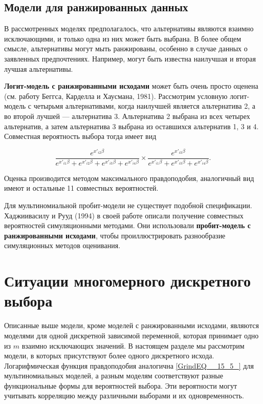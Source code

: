 \subsection{Модели для ранжированных данных}

В рассмотренных моделях предполагалось, что альтернативы являются взаимно исключающими, и только одна из них может быть выбрана. В более общем смысле, альтернативы могут мыть ранжированы, особенно в случае данных о заявленных предпочтениях. Например, могут быть известна наилучшая и вторая лучшая альтернативы. 

\textbf{Логит-модель с ранжированными исходами} может быть очень просто оценена (см. работу Беггса, Карделла и Хаусмана, 1981). Рассмотрим условную логит-модель с четырьмя альтернативами, когда наилучшей является альтернатива 2, а во второй лучшей --- альтернатива 3. Альтернатива 2 выбрана из всех четырех альтернатив, а затем альтернатива 3 выбрана из оставшихся альтернатив 1, 3 и 4. Совместная вероятность выбора тогда имеет вид 

\[\frac{e^{x'_{i2}\beta }}{e^{x'_{i1}\beta }+e^{x'_{i2}\beta }+e^{x'_{i3}\beta }+e^{x'_{i4}\beta }}\times \frac{e^{x'_{i3}\beta }}{e^{x'_{i1}\beta }+e^{x'_{i3}\beta }+e^{x'_{i4}\beta }}.\] 

Оценка производится методом максимального правдоподобия, аналогичный вид имеют и  остальные 11 совместных вероятностей.

Для мультиномиальной пробит-модели не существует подобной спецификации. Хаджиивасилу и Рууд  (1994) в своей работе описали получение совместных вероятностей симуляционными методами. Они использовали \textbf{пробит-модель с ранжированными исходами}, чтобы проиллюстрировать разнообразие симуляционных методов оценивания.

\section{Ситуации многомерного дискретного выбора}

Описанные выше модели, кроме моделей с ранжированными исходами, являются моделями для одной дискретной зависимой переменной, которая принимает одно из $m$ взаимно исключающих значений. В настоящем разделе мы рассмотрим модели, в которых присутствуют более одного дискретного исхода. Логарифмическая функция правдоподобия аналогична \eqref{GrindEQ__15_5_} для мультиномиальных моделей, а разным моделям соответствуют разные функциональные формы для вероятностей выбора. Эти вероятности могут учитывать корреляцию между различными выборами и их одновременность.

